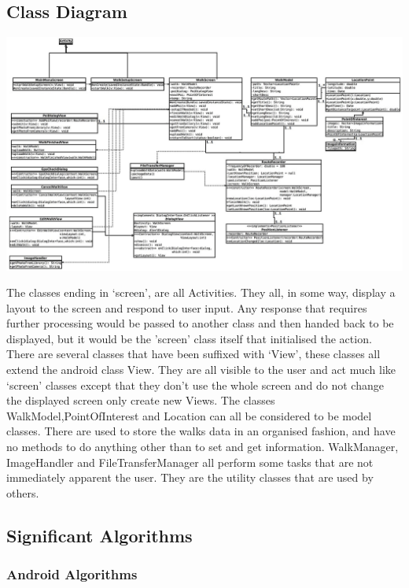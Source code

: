 \documentclass[12pt]{article}
\begin{document}
\subsection{Class Diagram}
\begin{landscape}
\begin{adjustwidth}{-0.65cm}{-0cm}
\includegraphics[scale=3.0]{Design/class_diagram_new.jpg}
\end{adjustwidth}
\end{landscape}
\restoregeometry
The classes ending in ‘screen’, are all Activities. They all, in some way, display a layout to the screen and respond to user input. Any response that requires further processing would be passed to another class and then handed back to be displayed, but it would be the ’screen’ class itself that initialised the action.  
There are several classes that have been suffixed with ‘View’, these classes all extend the android class View. They are all visible to the user and act much like ‘screen’ classes except that they don’t use the whole screen and do not change the displayed screen only create new Views.  
The classes WalkModel,PointOfInterest and Location can all be considered to be model classes. There are used to store the walks data in an organised fashion, and have no methods to do anything other than to set and get information.  
WalkManager, ImageHandler and FileTransferManager all perform some tasks that are not immediately apparent the user. They are the utility classes that are used by others.
\subsection{Significant Algorithms}
\subsubsection{Android Algorithms}
\end{document}
